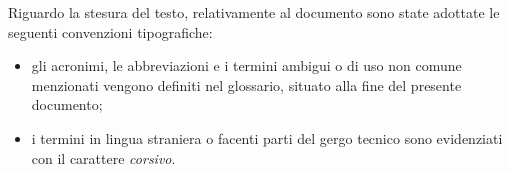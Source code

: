 Riguardo la stesura del testo, relativamente al documento sono state adottate le seguenti convenzioni tipografiche:
\begin{itemize}
	\item gli acronimi, le abbreviazioni e i termini ambigui o di uso non comune menzionati vengono definiti nel glossario, situato alla fine del presente documento;
	\item i termini in lingua straniera o facenti parti del gergo tecnico sono evidenziati con il carattere \emph{corsivo}.
\end{itemize}
